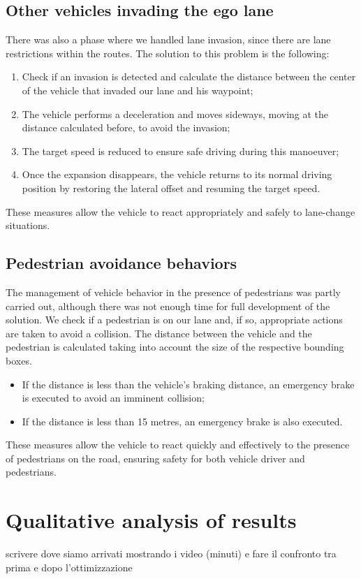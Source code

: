 \documentclass{article}
\begin{document}
\subsection{Other vehicles invading the ego lane}
There was also a phase where we handled lane invasion, since there are lane restrictions within the routes. 
The solution to this problem is the following:
\begin{enumerate}
    \item Check if an invasion is detected and calculate the distance between the center of the vehicle that invaded our lane and his waypoint;
    \item The vehicle performs a deceleration and moves sideways, moving at the distance calculated before, to avoid the invasion; 
    \item The target speed is reduced to ensure safe driving during this manoeuver;
    \item Once the expansion disappears, the vehicle returns to its normal driving position by restoring the lateral offset and resuming the target speed. 
\end{enumerate}
These measures allow the vehicle to react appropriately and safely to lane-change situations.

\subsection{Pedestrian avoidance behaviors}
The management of vehicle behavior in the presence of pedestrians was partly carried out, 
although there was not enough time for full development of the solution. 
We check if a pedestrian is on our lane and, if so, appropriate actions are taken to avoid a collision. 
The distance between the vehicle and the pedestrian is calculated taking into account the size of the 
respective bounding boxes.  
\begin{itemize}
    \item If the distance is less than the vehicle's braking distance, an emergency brake is executed to avoid an imminent collision;
    \item If the distance is less than 15 metres, an emergency brake is also executed. 
\end{itemize}
These measures allow the vehicle to react quickly and effectively to the presence of pedestrians on the road, 
ensuring safety for both vehicle driver and pedestrians.

\section{Qualitative analysis of results}
scrivere dove siamo arrivati mostrando i video (minuti) e fare il confronto tra prima e dopo l'ottimizzazione
\end{document}
